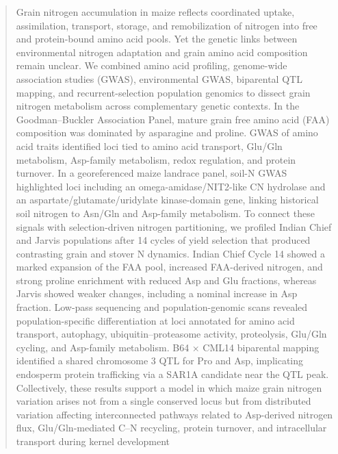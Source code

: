 \begin{abstract}
Grain nitrogen accumulation in maize reflects coordinated uptake, assimilation, transport, storage, and remobilization of nitrogen into free and protein-bound amino acid pools. Yet the genetic links between environmental nitrogen adaptation and grain amino acid composition remain unclear. We combined amino acid profiling, genome-wide association studies (GWAS), environmental GWAS, biparental QTL mapping, and recurrent-selection population genomics to dissect grain nitrogen metabolism across complementary genetic contexts. In the Goodman–Buckler Association Panel, mature grain free amino acid (FAA) composition was dominated by asparagine and proline. GWAS of amino acid traits identified loci tied to amino acid transport, Glu/Gln metabolism, Asp-family metabolism, redox regulation, and protein turnover. In a georeferenced maize landrace panel, soil-N GWAS highlighted loci including an omega-amidase/NIT2-like CN hydrolase and an aspartate/glutamate/uridylate kinase-domain gene, linking historical soil nitrogen to Asn/Gln and Asp-family metabolism. 
To connect these signals with selection-driven nitrogen partitioning, we profiled Indian Chief and Jarvis populations after 14 cycles of yield selection that produced contrasting grain and stover N dynamics. Indian Chief Cycle 14 showed a marked expansion of the FAA pool, increased FAA-derived nitrogen, and strong proline enrichment with reduced Asp and Glu fractions, whereas Jarvis showed weaker changes, including a nominal increase in Asp fraction. Low-pass sequencing and population-genomic scans revealed population-specific differentiation at loci annotated for amino acid transport, autophagy, ubiquitin–proteasome activity, proteolysis, Glu/Gln cycling, and Asp-family metabolism. B64 × CML14 biparental mapping identified a shared chromosome 3 QTL for Pro and Asp, implicating endosperm protein trafficking via a SAR1A candidate near the QTL peak. Collectively, these results support a model in which maize grain nitrogen variation arises not from a single conserved locus but from distributed variation affecting interconnected pathways related to Asp-derived nitrogen flux, Glu/Gln-mediated C–N recycling, protein turnover, and intracellular transport during kernel development
\end{abstract}




\maketitle
\thispagestyle{firststyle}
\vspace{-11pt}%

